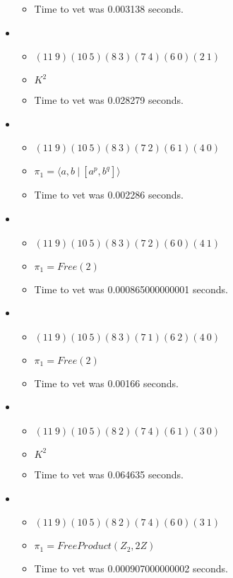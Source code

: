 \documentclass{article}
\begin{document}
\begin{itemize}
\begin{itemize}
      \item Time to vet was 0.003138 seconds.
\end{itemize}
\item \begin{itemize}
      \item $(11\ 9)(10\ 5)(8\ 3)(7\ 4)(6\ 0)(2\ 1)$
      \item $K^2$
      \item Time to vet was 0.028279 seconds.
\end{itemize}
\item \begin{itemize}
      \item $(11\ 9)(10\ 5)(8\ 3)(7\ 2)(6\ 1)(4\ 0)$
      \item $\pi_1 = \langle a,b\ |\ [a^p,b^q]\rangle$
      \item Time to vet was 0.002286 seconds.
\end{itemize}
\item \begin{itemize}
      \item $(11\ 9)(10\ 5)(8\ 3)(7\ 2)(6\ 0)(4\ 1)$
      \item $\pi_1 =Free(2)$
      \item Time to vet was 0.000865000000001 seconds.
\end{itemize}
\item \begin{itemize}
      \item $(11\ 9)(10\ 5)(8\ 3)(7\ 1)(6\ 2)(4\ 0)$
      \item $\pi_1 =Free(2)$
      \item Time to vet was 0.00166 seconds.
\end{itemize}
\item \begin{itemize}
      \item $(11\ 9)(10\ 5)(8\ 2)(7\ 4)(6\ 1)(3\ 0)$
      \item $K^2$
      \item Time to vet was 0.064635 seconds.
\end{itemize}
\item \begin{itemize}
      \item $(11\ 9)(10\ 5)(8\ 2)(7\ 4)(6\ 0)(3\ 1)$
      \item $\pi_1 =FreeProduct( Z_2, 2 Z )$
      \item Time to vet was 0.000907000000002 seconds.
\end{itemize}

\end{itemize}
\end{document}
